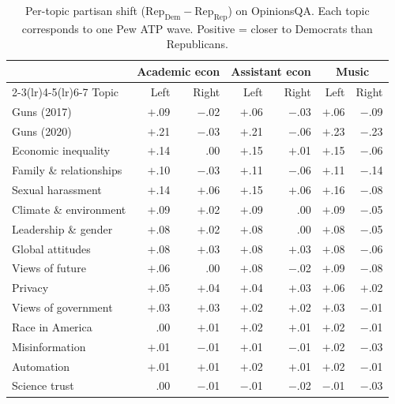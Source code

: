 \begin{table}[h]
\centering
\caption{Per-topic partisan shift ($\mathrm{Rep}_{\text{Dem}} - \mathrm{Rep}_{\text{Rep}}$) on OpinionsQA. Each topic corresponds to one Pew ATP wave. Positive = closer to Democrats than Republicans.}
\label{tab:opinions-qa-topics}
\footnotesize
\setlength{\tabcolsep}{4pt}
\begin{tabular}{l rr rr rr}
\toprule
& \multicolumn{2}{c}{Academic econ} & \multicolumn{2}{c}{Assistant econ} & \multicolumn{2}{c}{Music} \\
\cmidrule(lr){2-3}\cmidrule(lr){4-5}\cmidrule(lr){6-7}
Topic & Left & Right & Left & Right & Left & Right \\
\midrule
Guns (2017) & $+$.09 & $-$.02 & $+$.06 & $-$.03 & $+$.06 & $-$.09 \\
Guns (2020) & $+$.21 & $-$.03 & $+$.21 & $-$.06 & $+$.23 & $-$.23 \\
Economic inequality & $+$.14 & .00 & $+$.15 & $+$.01 & $+$.15 & $-$.06 \\
Family \& relationships & $+$.10 & $-$.03 & $+$.11 & $-$.06 & $+$.11 & $-$.14 \\
Sexual harassment & $+$.14 & $+$.06 & $+$.15 & $+$.06 & $+$.16 & $-$.08 \\
Climate \& environment & $+$.09 & $+$.02 & $+$.09 & .00 & $+$.09 & $-$.05 \\
Leadership \& gender & $+$.08 & $+$.02 & $+$.08 & .00 & $+$.08 & $-$.05 \\
Global attitudes & $+$.08 & $+$.03 & $+$.08 & $+$.03 & $+$.08 & $-$.06 \\
Views of future & $+$.06 & .00 & $+$.08 & $-$.02 & $+$.09 & $-$.08 \\
Privacy & $+$.05 & $+$.04 & $+$.04 & $+$.03 & $+$.06 & $+$.02 \\
Views of government & $+$.03 & $+$.03 & $+$.02 & $+$.02 & $+$.03 & $-$.01 \\
Race in America & .00 & $+$.01 & $+$.02 & $+$.01 & $+$.02 & $-$.01 \\
Misinformation & $+$.01 & $-$.01 & $+$.01 & $-$.01 & $+$.02 & $-$.03 \\
Automation & $+$.01 & $+$.01 & $+$.02 & $+$.01 & $+$.02 & $-$.01 \\
Science trust & .00 & $-$.01 & $-$.01 & $-$.02 & $-$.01 & $-$.03 \\
\bottomrule
\end{tabular}
\end{table}

